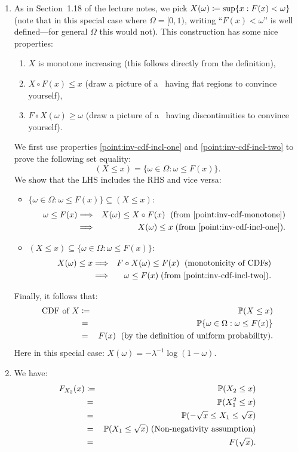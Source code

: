 \documentclass{article}
\begin{document}
\begin{enumerate}
   \item As in Section~1.18 of the lecture notes, we pick $X(\omega) \coloneqq \sup\{x : F(x) < \omega\}$ (note that in this special case where $\Omega = [0, 1)$,  writing ``$F(x) < \omega$'' is well defined---for general $\Omega$ this would not).
This construction has some nice properties:
\begin{enumerate}
  \item \label{point:inv-cdf-monotone} $X$ is monotone increasing (this follows directly from the definition),
  \item \label{point:inv-cdf-incl-one} $X\circ F(x) \le x$ (draw a picture of a \CDF\ having flat regions to convince yourself),
  \item \label{point:inv-cdf-incl-two}$F\circ X(\omega) \ge \omega$ (draw a picture of a \CDF\ having discontinuities to convince yourself).
\end{enumerate}
We first use properties \ref{point:inv-cdf-incl-one} and \ref{point:inv-cdf-incl-two} to prove the following set equality:
\[ (X \le x) = \{\omega \in \Omega : \omega \le F(x) \}.\]
We show that the LHS includes the RHS and vice versa:
\begin{itemize} 
  \item $\{\omega \in \Omega : \omega \le F(x) \} \subseteq (X \le x)$:
\begin{eqnarray*}
\omega \le F(x) &\Longrightarrow& X(\omega)  \le X\circ F(x)\;\text{ (from \ref{point:inv-cdf-monotone})} \\
&\Longrightarrow& X(\omega) \le x\;\text{(from \ref{point:inv-cdf-incl-one}).}
\end{eqnarray*}
  \item $(X \le x) \subseteq \{\omega \in \Omega : \omega \le F(x) \}$:
\begin{eqnarray*}
X(\omega) \le x &\Longrightarrow& F\circ X(\omega)  \le F(x)\;\text{ (monotonicity of CDFs)} \\
&\Longrightarrow& \omega \le F(x)\;\text{(from \ref{point:inv-cdf-incl-two}).} 
\end{eqnarray*}
\end{itemize}
Finally, it follows that:
\begin{eqnarray*}
\text{CDF of }X &\coloneqq& {\mathbb P}(X \le x) \\ 
&=& {\mathbb P}\{\omega \in \Omega : \omega \le F(x) \} \\ 
&=& F(x) \;\text{ (by the definition of uniform probability).}  
\end{eqnarray*}
Here in this special case: $X(\omega) = - \lambda^{-1} \log(1 - \omega)$. 
\item We have:
\begin{eqnarray*}
F_{X_2}(x) &\coloneqq& {\mathbb P}(X_2 \le x) \\
&=& {\mathbb P}(X_1^2 \le x) \\
&=& {\mathbb P}(-\sqrt{x} \le X_1 \le \sqrt{x}) \\
&=& {\mathbb P}(X_1 \le \sqrt{x}) \;\text{(Non-negativity assumption)} \\
&=& F(\sqrt{x}).
\end{eqnarray*}


\end{enumerate}
\end{document}
